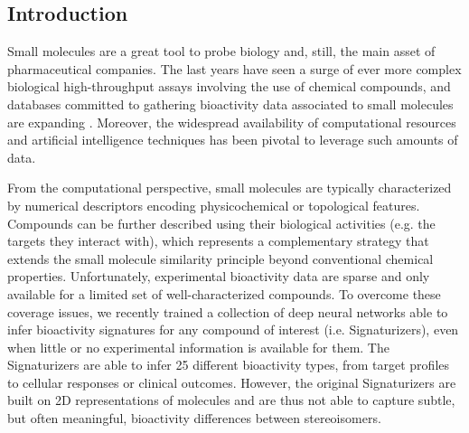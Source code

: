 \subsection{Introduction}


Small molecules are a great tool to probe biology and, still, the main asset of pharmaceutical companies. The last years have seen a surge of ever more complex biological high-throughput assays involving the use of chemical compounds, and databases committed to gathering bioactivity data associated to small molecules are expanding \cite{zdrazil_chembl_2024, kim_pubchem_2023}. Moreover, the widespread availability of computational resources\cite{tetko_bigchem_2016} and artificial intelligence techniques has been pivotal to leverage such amounts of data\cite{von_lilienfeld_retrospective_2020}. 

From the computational perspective, small molecules are typically characterized by numerical descriptors encoding physicochemical or topological features\cite{fernandez-torras_connecting_2022}. Compounds can be further described using their biological activities (e.g. the targets they interact with), which represents a complementary strategy that extends the small molecule similarity principle beyond conventional chemical properties\cite{duran-frigola_extending_2020}. Unfortunately, experimental bioactivity data are sparse and only available for a limited set of well-characterized compounds. To overcome these coverage issues, we recently trained a collection of deep neural networks able to infer bioactivity signatures for any compound of interest (i.e. Signaturizers), even when little or no experimental information is available for them\cite{bertoni_bioactivity_2021}. The Signaturizers are able to infer 25 different bioactivity types, from target profiles to cellular responses or clinical outcomes. However, the original Signaturizers are built on 2D representations of molecules and are thus not able to capture subtle, but often meaningful, bioactivity differences between stereoisomers. 

